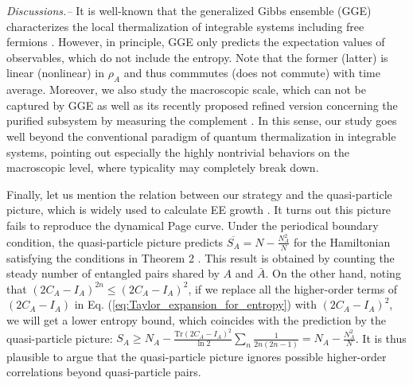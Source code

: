 \documentclass[twocolumn,english,prl,aps,superscriptaddress,amsmath,amssymb,floatfix]{revtex4-2}
\begin{document}
\emph{Discussions.--}%
It is well-known that the generalized Gibbs ensemble (GGE) %
characterizes %
the local thermalization of integrable systems including free fermions \citep{PhysRevLett.98.050405, Cassidy2011,doi:10.1126/science.1257026, Essler2016,Ishii2019}. %
However, in principle,
GGE only predicts the expectation values of observables, which do not include the entropy. Note that the former (latter) is linear (nonlinear) in $\rho_A$ and thus commmutes (does not commute) with time average. 
Moreover, %
we also study the macroscopic scale, which can not be captured by GGE as well as its recently proposed refined version \cite{Lucas2022} concerning the purified subsystem by measuring the complement %
\cite{Ho2022}. In this sense, our study goes well beyond the conventional paradigm of quantum thermalization in integrable systems, pointing out especially the highly nontrivial behaviors on the macroscopic level, where typicality may completely break down. %

Finally, let us mention the relation between our %
strategy
and the quasi-particle picture, which is widely %
used to calculate %
EE %
growth \citep{PhysRevLett.127.060404,Jurcevic2014,Castro2016_,Essler2016,Calabrese2005,Fagotti2008,Bertini2018,BertiniB2018_2}. %
It turns out this picture fails to %
reproduce the %
dynamical Page curve. Under the %
periodical boundary condition, the quasi-particle
picture predicts %
$\overline{S_{A}}=N-\frac{N_{A}^{2}}{N}$
for the Hamiltonian satisfying the conditions in Theorem 2 \cite{SM}. This result is obtained by counting the steady number of entangled pairs shared by $A$ and $\bar A$. %
On the other hand, noting that $(2C_{A}-I_{A})^{2n}\leq(2C_{A}-I_{A})^{2}$,
if we replace all the higher-order terms of $(2C_{A}-I_{A})$ in Eq. (\ref{eq:Taylor_expansion_for_entropy})
with $(2C_{A}-I_{A})^{2}$, we will get a lower entropy 
bound, %
which coincides with the prediction %
by the quasi-particle picture: $S_{A}\geq N_{A}-\frac{\mathrm{Tr}(2C_{A}-I_{A})^{2}}{\ln2}\sum_{n}\frac{1}{2n(2n-1)}=N_{A}-\frac{N_{A}^{2}}{N}$.
It is thus plausible %
to argue that the quasi-particle picture ignores
possible higher-order correlations beyond %
quasi-particle pairs. %
\end{document}
